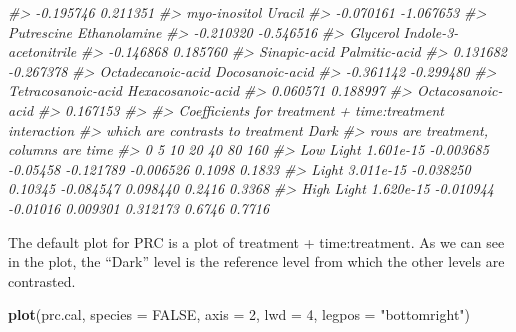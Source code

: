 \documentclass[
]{article}
\newenvironment{Shaded}{\begin{snugshade}}{\end{snugshade}}
\newcommand{\AttributeTok}[1]{\textcolor[rgb]{0.13,0.29,0.53}{#1}}
\newcommand{\CommentTok}[1]{\textcolor[rgb]{0.56,0.35,0.01}{\textit{#1}}}
\newcommand{\ConstantTok}[1]{\textcolor[rgb]{0.56,0.35,0.01}{#1}}
\newcommand{\DecValTok}[1]{\textcolor[rgb]{0.00,0.00,0.81}{#1}}
\newcommand{\FunctionTok}[1]{\textcolor[rgb]{0.13,0.29,0.53}{\textbf{#1}}}
\newcommand{\NormalTok}[1]{#1}
\newcommand{\StringTok}[1]{\textcolor[rgb]{0.31,0.60,0.02}{#1}}
\begin{document}
\begin{Shaded}
\begin{Highlighting}[]
\CommentTok{\#\textgreater{}                  {-}0.195746                   0.211351 }
\CommentTok{\#\textgreater{}               myo{-}inositol                     Uracil }
\CommentTok{\#\textgreater{}                  {-}0.070161                  {-}1.067653 }
\CommentTok{\#\textgreater{}                 Putrescine               Ethanolamine }
\CommentTok{\#\textgreater{}                  {-}0.210320                  {-}0.546516 }
\CommentTok{\#\textgreater{}                   Glycerol      Indole{-}3{-}acetonitrile }
\CommentTok{\#\textgreater{}                  {-}0.146868                   0.185760 }
\CommentTok{\#\textgreater{}               Sinapic{-}acid              Palmitic{-}acid }
\CommentTok{\#\textgreater{}                   0.131682                  {-}0.267378 }
\CommentTok{\#\textgreater{}          Octadecanoic{-}acid            Docosanoic{-}acid }
\CommentTok{\#\textgreater{}                  {-}0.361142                  {-}0.299480 }
\CommentTok{\#\textgreater{}         Tetracosanoic{-}acid          Hexacosanoic{-}acid }
\CommentTok{\#\textgreater{}                   0.060571                   0.188997 }
\CommentTok{\#\textgreater{}          Octacosanoic{-}acid }
\CommentTok{\#\textgreater{}                   0.167153 }
\CommentTok{\#\textgreater{} }
\CommentTok{\#\textgreater{} Coefficients for treatment + time:treatment interaction}
\CommentTok{\#\textgreater{} which are contrasts to treatment Dark }
\CommentTok{\#\textgreater{} rows are treatment, columns are time}
\CommentTok{\#\textgreater{}                    0         5       10        20        40     80    160}
\CommentTok{\#\textgreater{} Low Light  1.601e{-}15 {-}0.003685 {-}0.05458 {-}0.121789 {-}0.006526 0.1098 0.1833}
\CommentTok{\#\textgreater{} Light      3.011e{-}15 {-}0.038250  0.10345 {-}0.084547  0.098440 0.2416 0.3368}
\CommentTok{\#\textgreater{} High Light 1.620e{-}15 {-}0.010944 {-}0.01016  0.009301  0.312173 0.6746 0.7716}
\end{Highlighting}
\end{Shaded}

The default plot for PRC is a plot of treatment + time:treatment. As we
can see in the plot, the ``Dark'' level is the reference level from
which the other levels are contrasted.

\begin{Shaded}
\begin{Highlighting}[]
\FunctionTok{plot}\NormalTok{(prc.cal, }\AttributeTok{species =} \ConstantTok{FALSE}\NormalTok{, }\AttributeTok{axis =} \DecValTok{2}\NormalTok{, }\AttributeTok{lwd =} \DecValTok{4}\NormalTok{, }\AttributeTok{legpos =} \StringTok{"bottomright"}\NormalTok{)}
\end{Highlighting}
\end{Shaded}
\end{document}
